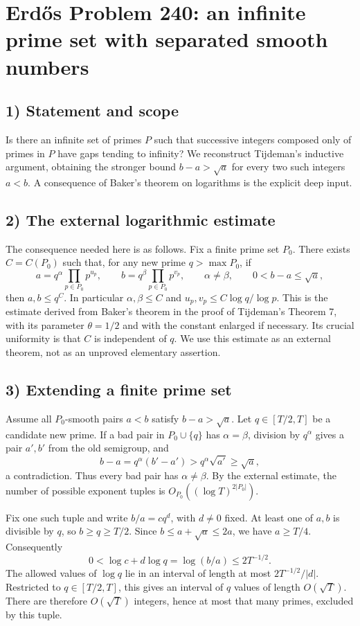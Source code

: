 \section{Erd\H{o}s Problem 240: an infinite prime set with separated smooth numbers}

\subsection{1) Statement and scope}
Is there an infinite set of primes $P$ such that successive
integers composed only of primes in $P$ have gaps tending to
infinity? We reconstruct Tijdeman's inductive argument, obtaining
the stronger bound $b-a>\sqrt a$ for every two such integers
$a<b$. A consequence of Baker's theorem on logarithms is the
explicit deep input.

\subsection{2) The external logarithmic estimate}
The consequence needed here is as follows. Fix a finite prime
set $P_0$. There exists $C=C(P_0)$ such that, for any new prime
$q>\max P_0$, if
\[
 a=q^\alpha\prod_{p\in P_0}p^{u_p},\qquad
 b=q^\beta\prod_{p\in P_0}p^{v_p},\qquad
 \alpha\ne\beta,\qquad 0<b-a\leq\sqrt a,
\]
then $a,b\leq q^C$. In particular $\alpha,\beta\leq C$ and
$u_p,v_p\leq C\log q/\log p$.
This is the estimate derived from Baker's theorem in the proof
of Tijdeman's Theorem 7, with its parameter $\theta=1/2$
and with the constant enlarged if necessary.
Its crucial uniformity is that $C$ is independent of $q$.
We use this estimate as an external theorem, not as an
unproved elementary assertion.

\subsection{3) Extending a finite prime set}
Assume all $P_0$-smooth pairs $a<b$ satisfy $b-a>\sqrt a$.
Let $q\in[T/2,T]$ be a candidate new prime. If a bad pair in
$P_0\cup\{q\}$ has $\alpha=\beta$, division by $q^\alpha$ gives
a pair $a',b'$ from the old semigroup, and
\[
 b-a=q^\alpha(b'-a')>
     q^\alpha\sqrt{a'}\geq\sqrt a,
\]
a contradiction. Thus every bad pair has $\alpha\ne\beta$.
By the external estimate, the number of possible exponent tuples
is $O_{P_0}((\log T)^{2|P_0|})$.

Fix one such tuple and write $b/a=cq^d$, with $d\ne0$ fixed.
At least one of $a,b$ is divisible by $q$, so $b\geq q\geq T/2$.
Since $b\leq a+\sqrt a\leq2a$, we have $a\geq T/4$. Consequently
\[
 0<\log c+d\log q=\log(b/a)\leq2T^{-1/2}.
\]
The allowed values of $\log q$ lie in an interval of length
at most $2T^{-1/2}/|d|$. Restricted to $q\in[T/2,T]$, this
gives an interval of $q$ values of length $O(\sqrt T)$.
There are therefore $O(\sqrt T)$ integers, hence at most that
many primes, excluded by this tuple.

